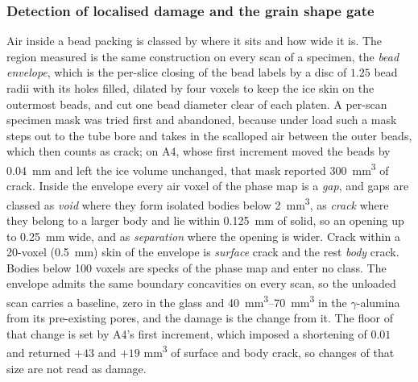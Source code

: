 \documentclass[preprint,12pt,numbers]{elsarticle}
\begin{document}
  \subsubsection{Detection of localised damage and the grain shape gate}
  \label{sec:crackdetect}
  \label{sec:shapegate}
  Air inside a bead packing is classed by where it sits and how wide it is.
  The region measured is the same construction on every scan of a specimen,
  the \emph{bead envelope}, which is the per-slice closing of the bead labels
  by a disc of $1.25$ bead radii with its holes filled, dilated by four
  voxels to keep the ice skin on the outermost beads, and cut one bead
  diameter clear of each platen.  A per-scan specimen mask was tried first
  and abandoned, because under load such a mask steps out to the tube bore
  and takes in the scalloped air between the outer beads, which then counts
  as crack; on A4, whose first increment moved the beads by
  \SI{0.04}{\milli\meter} and left the ice volume unchanged, that mask
  reported \SI{300}{\milli\meter\cubed} of crack.  Inside the envelope every
  air voxel of the phase map is a \emph{gap}, and gaps are classed as
  \emph{void} where they form isolated bodies below \SI{2}{\milli\meter\cubed},
  as \emph{crack} where they belong to a larger body and lie within
  \SI{0.125}{\milli\meter} of solid, so an opening up to \SI{0.25}{\milli\meter}
  wide, and as \emph{separation} where the opening is wider.  Crack within a
  20-voxel (\SI{0.5}{\milli\meter}) skin of the envelope is \emph{surface}
  crack and the rest \emph{body} crack.  Bodies below 100 voxels are specks
  of the phase map and enter no class.  The envelope admits the same
  boundary concavities on every scan, so the unloaded scan carries a baseline,
  zero in the glass and \SIrange{40}{70}{\milli\meter\cubed} in the
  $\gamma$-alumina from its pre-existing pores, and the damage is the change
  from it.  The floor of that change is set by A4's first increment, which
  imposed a shortening of $0.01$ and returned $+43$ and $+19$
  \si{\milli\meter\cubed} of surface and body crack, so changes of that size
  are not read as damage.
\end{document}
